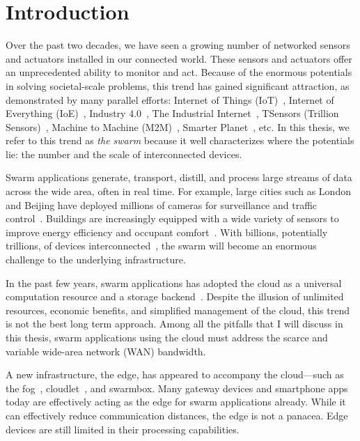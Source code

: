 \documentclass[thesis.tex]{subfiles}
\begin{document}
\chapter{Introduction}

Over the past two decades, we have seen a growing number of networked sensors
and actuators installed in our connected world. These sensors and actuators
offer an unprecedented ability to monitor and act. Because of the enormous
potentials in solving societal-scale problems, this trend has gained significant
attraction, as demonstrated by many parallel efforts: Internet of Things
(IoT)~\cite{atzori2010internet}, Internet of Everything
(IoE)~\cite{bradley2013internet}, Industry 4.0~\cite{lasi2014industry}, The
Industrial Internet~\cite{eigner2018industrial}, TSensors (Trillion
Sensors)~\cite{bogue2014towards}, Machine to Machine
(M2M)~\cite{anton2014machine}, Smarter Planet~\cite{palmisano2008smarter},
etc. In this thesis, we refer to this trend as \textit{the swarm} because it
well characterizes where the potentials lie: the number and the scale of
interconnected devices.

Swarm applications generate, transport, distill, and process large streams of
data across the wide area, often in real time. For example, large cities such as
London and Beijing have deployed millions of cameras for surveillance and
traffic control~\cite{skynet, london.surveillance}. Buildings are increasingly
equipped with a wide variety of sensors to improve energy efficiency and
occupant comfort~\cite{dawson2010smap, krioukov2012building}. With billions,
potentially trillions, of devices interconnected~\cite{middleton2013forecast},
the swarm will become an enormous challenge to the underlying infrastructure.

In the past few years, swarm applications has adopted the cloud as a universal
computation resource and a storage backend~\cite{carriots, grovestreams, sami,
  xively, gupta2014bolt, zachariah1001internet}. Despite the illusion of
unlimited resources, economic benefits, and simplified management of the cloud,
this trend is not the best long term approach. Among all the pitfalls that I
will discuss in this thesis, swarm applications using the cloud must address the
scarce and variable wide-area network (WAN) bandwidth.

A new infrastructure, the edge, has appeared to accompany the cloud---such as
the fog~\cite{bonomi2012fog, bar2013fog}, cloudlet~\cite{ha2014towards,
  satyanarayanan2009case, chen2018application}, and swarmbox. Many gateway
devices and smartphone apps today are effectively acting as the edge for swarm
applications already. While it can effectively reduce communication distances,
the edge is not a panacea. Edge devices are still limited in their processing
capabilities.
\end{document}
